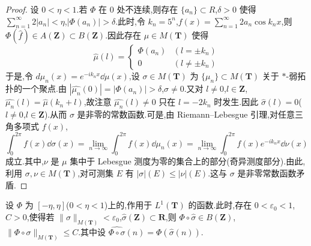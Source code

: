 \begin{proof}
设 $0 < \eta < 1$.若 $\Phi$ 在 0 处不连续,则存在 $\{a_{n}\} \subset R$,$\delta > 0$ 使得 $\sum_{n=1}^{\infty}2|a_{n}| < \eta$,$|\Phi(a_{n})| > \delta$.此时,令 $k_{n} = 5^{n}$,$f(x) = \sum_{n=1}^{\infty}2a_{n}\cos k_{n}x$,则 $\Phi(\widehat{f}) \in A(\mathbf{Z}) \subset B(\mathbf{Z})$.因此存在 $\mu \in M(\mathbf{T})$ 使得
\begin{equation*}
\widehat{\mu}(l) = \left\{\begin{array}{ll}
\Phi(a_{n}) & (l = \pm k_{n})\\
0 & (l \neq \pm k_{n})
\end{array}\right.
\end{equation*}
于是,令 $d\mu_{n}(x) = e^{-ik_{n}x}\dd\mu(x)$,设 $\sigma \in M(\mathbf{T})$ 为 $\{\mu_{n}\} \subset M(\mathbf{T})$ 关于 $*$-弱拓扑的一个聚点.由 $|\widehat{\mu_{n}}(0)| = |\Phi(a_{n})| > \delta$,$\sigma \neq 0$.又对 $l \neq 0$,$l \in \mathbf{Z}$,$\widehat{\mu_{n}}(l) = \widehat{\mu}(k_{n} + l)$,故注意 $\widehat{\mu_{n}}(l) \neq 0$ 只在 $l = -2k_{n}$ 时发生.因此 $\widehat{\sigma}(l) = 0$($l \neq 0$,$l \in \mathbf{Z}$).从而 $\sigma$ 是非零的常数函数.可是,由 Riemann--Lebesgue 引理,对任意三角多项式 $f(x)$,
\begin{equation*}
\int_{0}^{2\pi}f(x)\dd\sigma(x) = \lim_{n \to \infty}\int_{0}^{2\pi}f(x)\dd\mu_{n}(x) = \lim_{n \to \infty}\int_{0}^{2\pi}f(x)e^{-ik_{n}x}\dd\nu(x)
\end{equation*}
成立.其中,$\nu$ 是 $\mu$ 集中于 Lebesgue 测度为零的集合上的部分(奇异测度部分).由此,利用 $\sigma, \nu \in M(\mathbf{T})$,对可测集 $E$ 有 $|\sigma|(E) \leq |\nu|(E)$.这与 $\sigma$ 是非零常数函数矛盾.
\end{proof}

\begin{lemma}\label{lem:3.5.11}
设 $\Phi$ 为 $[-\eta, \eta]$($0 < \eta < 1$)上的,作用于 $L^{1}(\mathbf{T})$ 的函数.此时,存在 $0 < \varepsilon_{0} < 1$,$C > 0$,使得若 $\|\sigma\|_{M(\mathbf{T})} < \varepsilon_{0}$,$\widehat{\sigma}(\mathbf{Z}) \subset \mathbf{R}$,则 $\Phi \circ \widehat{\sigma} \in B(\mathbf{Z})$,$\|\Phi \circ \sigma\|_{M(\mathbf{T})} \leq C$.其中设 $\widehat{\Phi \circ \sigma}(n) = \Phi(\widehat{\sigma}(n))$.
\end{lemma}


